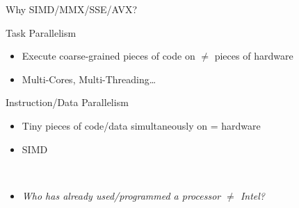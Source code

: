 \documentclass[presentation]{beamer}
\begin{document}
\begin{frame}[label={sec:orgc8a6a15}]{Why SIMD/MMX/SSE/AVX?}
\begin{block}{Task Parallelism}
\begin{itemize}
\item Execute coarse-grained pieces of code on \(\neq\) pieces of hardware
\item Multi-Cores, \alert{Multi-Threading}\ldots{}
\end{itemize}
\pause
\end{block}
\begin{block}{Instruction/Data Parallelism}
\begin{itemize}
\item Tiny pieces of code/data simultaneously on = hardware
\item \alert{SIMD}
\end{itemize}
\pause
\end{block}

\begin{block}{ ~~}
\bigskip
\begin{itemize}
\item \emph{Who has already used/programmed a processor \(\neq\) Intel?}
\bigskip
\end{itemize}
\end{block}
\end{frame}
\end{document}
